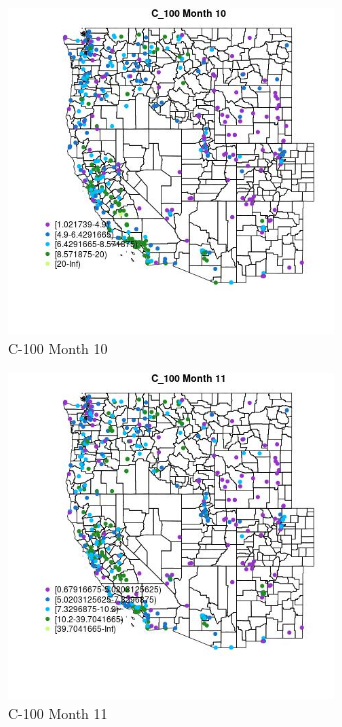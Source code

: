 \begin{figure} 
\centering  
\includegraphics[width=0.77\textwidth]{Code_Outputs/ML_input_report_ML_input_PM25_Step5_part_d_de_duplicated_aves_ML_input_MapObsMo10C_100.jpg} 
\caption{\label{fig:ML_input_report_ML_input_PM25_Step5_part_d_de_duplicated_aves_ML_inputMapObsMo10C_100}C-100 Month 10} 
\end{figure} 
 

\begin{figure} 
\centering  
\includegraphics[width=0.77\textwidth]{Code_Outputs/ML_input_report_ML_input_PM25_Step5_part_d_de_duplicated_aves_ML_input_MapObsMo11C_100.jpg} 
\caption{\label{fig:ML_input_report_ML_input_PM25_Step5_part_d_de_duplicated_aves_ML_inputMapObsMo11C_100}C-100 Month 11} 
\end{figure} 
 

